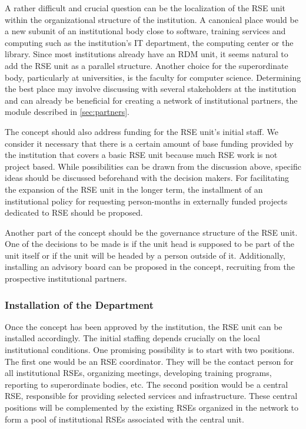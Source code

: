 \documentclass[a4paper]{article}
\begin{document}
A rather difficult and crucial question can be the localization of the RSE unit within the organizational structure of the institution.
A canonical place would be a new subunit of an institutional body close to software,
training services and computing such as the institution's IT department, the computing center or the library.
Since most institutions already have an RDM unit, it seems natural to add the RSE unit as a parallel structure.
Another choice for the superordinate body, particularly at universities, is the faculty for computer science.
Determining the best place may involve discussing with several stakeholders at the institution and can already be beneficial for creating a
network of institutional partners, the module described in \autoref{sec:partners}.

The concept should also address funding for the RSE unit's initial staff.
We consider it necessary that there is a certain amount of base funding provided by the institution that covers a basic RSE unit because much RSE work is not project based.
While possibilities can be drawn from the discussion above, specific ideas should be discussed beforehand with the decision makers.
For facilitating the expansion of the RSE unit in the longer term, the installment of an institutional policy for requesting person-months in externally funded projects dedicated to RSE should be proposed.

Another part of the concept should be the governance structure of the RSE unit.
One of the decisions to be made is if the unit head is supposed to be part of the unit itself or if the unit will be headed by a person outside of it.
Additionally, installing an advisory board can be proposed in the concept, recruiting from the prospective institutional partners.

\subsubsection{Installation of the Department}
Once the concept has been approved by the institution, the RSE unit can be installed accordingly.
The initial staffing depends crucially on the local institutional conditions.
One promising possibility is to start with two positions.
The first one would be an RSE coordinator.
They will be the contact person for all institutional RSEs, organizing meetings, developing training programs, reporting to superordinate bodies, etc.
The second position would be a central RSE, responsible for providing selected services and infrastructure.
These central positions will be complemented by the existing RSEs organized in the network to form a pool of institutional RSEs associated with the central unit.
\end{document}
